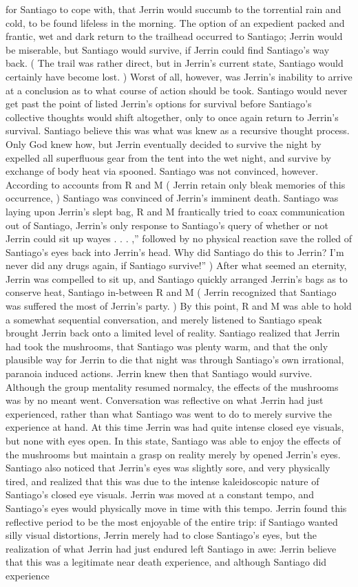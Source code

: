 \documentclass[12pt]{book}
\begin{document}
for Santiago to cope with, that Jerrin would succumb to the torrential rain and cold, to be found lifeless in the morning. The option of an expedient packed and frantic, wet and dark return to the trailhead occurred to Santiago; Jerrin would be miserable, but Santiago would survive, if Jerrin could find Santiago's way back. ( The trail was rather direct, but in Jerrin's current state, Santiago would certainly have become lost. ) Worst of all, however, was Jerrin's inability to arrive at a conclusion as to what course of action should be took. Santiago would never get past the point of listed Jerrin's options for survival before Santiago's collective thoughts would shift altogether, only to once again return to Jerrin's survival. Santiago believe this was what was knew as a recursive thought process. Only God knew how, but Jerrin eventually decided to survive the night by expelled all superfluous gear from the tent into the wet night, and survive by exchange of body heat via spooned. Santiago was not convinced, however. According to accounts from R and M ( Jerrin retain only bleak memories of this occurrence, ) Santiago was convinced of Jerrin's imminent death. Santiago was laying upon Jerrin's slept bag, R and M frantically tried to coax communication out of Santiago, Jerrin's only response to Santiago's query of whether or not Jerrin could sit up wayes . . .  ,'' followed by no physical reaction save the rolled of Santiago's eyes back into Jerrin's head. Why did Santiago do this to Jerrin? I'm never did any drugs again, if Santiago survive!'' ) After what seemed an eternity, Jerrin was compelled to sit up, and Santiago quickly arranged Jerrin's bags as to conserve heat, Santiago in-between R and M ( Jerrin recognized that Santiago was suffered the most of Jerrin's party. ) By this point, R and M was able to hold a somewhat sequential conversation, and merely listened to Santiago speak brought Jerrin back onto a limited level of reality. Santiago realized that Jerrin had took the mushrooms, that Santiago was plenty warm, and that the only plausible way for Jerrin to die that night was through Santiago's own irrational, paranoia induced actions. Jerrin knew then that Santiago would survive. Although the group mentality resumed normalcy, the effects of the mushrooms was by no meant went. Conversation was reflective on what Jerrin had just experienced, rather than what Santiago was went to do to merely survive the experience at hand. At this time Jerrin was had quite intense closed eye visuals, but none with eyes open. In this state, Santiago was able to enjoy the effects of the mushrooms but maintain a grasp on reality merely by opened Jerrin's eyes. Santiago also noticed that Jerrin's eyes was slightly sore, and very physically tired, and realized that this was due to the intense kaleidoscopic nature of Santiago's closed eye visuals. Jerrin was moved at a constant tempo, and Santiago's eyes would physically move in time with this tempo. Jerrin found this reflective period to be the most enjoyable of the entire trip: if Santiago wanted silly visual distortions, Jerrin merely had to close Santiago's eyes, but the realization of what Jerrin had just endured left Santiago in awe: Jerrin believe that this was a legitimate near death experience, and although Santiago did experience 
\end{document}
